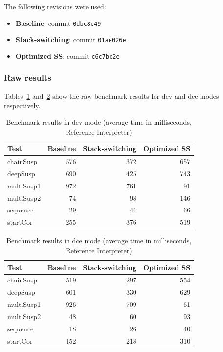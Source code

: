 The following revisions were used:
\begin{itemize}
    \item \textbf{Baseline}: commit \texttt{0dbc8c49}
    \item \textbf{Stack-switching}: commit \texttt{01ae026e}
    \item \textbf{Optimized SS}: commit \texttt{c6c7bc2e}
\end{itemize}

\subsubsection*{Raw results}

Tables~\ref{tab:benchmark-ref-dev} and~\ref{tab:benchmark-ref-dce} show the raw benchmark results for dev and dce modes respectively.

\begin{table}[H]
\centering
\caption{Benchmark results in dev mode (average time in milliseconds, Reference Interpreter)}
\label{tab:benchmark-ref-dev}
\begin{tabular}{|l|r|r|r|}
\hline
\textbf{Test} & \textbf{Baseline} & \textbf{Stack-switching} & \textbf{Optimized SS} \\
\hline
chainSusp & 576 & 372 & 657 \\
deepSusp & 690 & 425 & 743 \\
multiSusp1 & 972 & 761 & 91 \\
multiSusp2 & 74 & 98 & 146 \\
sequence & 29 & 44 & 66 \\
startCor & 255 & 376 & 519 \\
\hline
\end{tabular}
\end{table}

\begin{table}[H]
\centering
\caption{Benchmark results in dce mode (average time in milliseconds, Reference Interpreter)}
\label{tab:benchmark-ref-dce}
\begin{tabular}{|l|r|r|r|}
\hline
\textbf{Test} & \textbf{Baseline} & \textbf{Stack-switching} & \textbf{Optimized SS} \\
\hline
chainSusp & 519 & 297 & 554 \\
deepSusp & 601 & 330 & 629 \\
multiSusp1 & 926 & 709 & 61 \\
multiSusp2 & 48 & 60 & 93 \\
sequence & 18 & 26 & 40 \\
startCor & 152 & 218 & 310 \\
\hline
\end{tabular}
\end{table}

